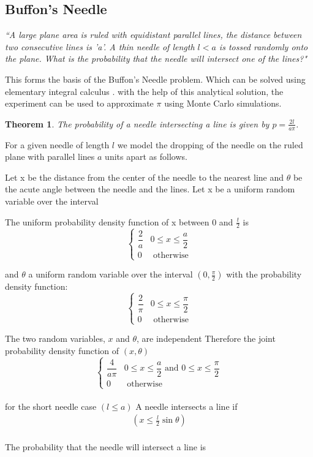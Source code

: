 \documentclass[12pt]{article}
\numberwithin{equation}{section}
\newtheorem{theorem}{Theorem}[section]
\begin{document}
\subsection{Buffon's Needle}
 \textit{“A large plane area is ruled with equidistant parallel lines, the distance between two consecutive lines is 'a'. A thin needle of length $l< a$ is tossed randomly onto the plane. What is the probability that the needle will intersect one of the lines?"}\par
 This forms the basis of the Buffon’s Needle problem. Which can be solved using elementary integral calculus \cite{needlewang}. with the help of this analytical solution, the experiment can be used to approximate $\pi$ using Monte Carlo simulations.
\begin{theorem}
The probability of a needle intersecting a line is given by $p=\frac{2l}{a \pi}$.
\end{theorem}
 For a given needle of length $l$ we model the dropping of the needle on the ruled plane with parallel lines $a$ units apart as follows. \par
 Let x be the distance from the center of the needle to the nearest line and $\theta$ be the acute angle between the needle and the lines. Let x be a uniform random variable over the interval
\par
The uniform probability density function of x between 0 and $ \frac{t}{2}$ is
\[
\begin{cases}
   \dfrac{2}{a} & 0 \leqslant x\leqslant \dfrac{a}{2}\\
  0 & \text {   otherwise}
\end{cases}
\]
\par
and $\theta$ a uniform random variable over the interval $\left(0, \frac{\pi}{2}\right)$ with the probability density function:\\
\[
\begin{cases}
    \dfrac{2}{\pi} & 0 \leqslant x\leqslant \dfrac{\pi}{2}\\
    0 & \text {   otherwise}
\end{cases}
\]
\par
The two random variables, $x$ and $\theta$, are independent  Therefore the joint probability density function of
$(x,\theta)$ 
\[
\begin{cases}
    \dfrac{4}{a\pi} &  0 \leqslant x\leqslant \dfrac{a}{2} \text{ and } 0 \leqslant x\leqslant \dfrac{\pi}{2}\\
0  &  \text {   otherwise}
\end{cases}\]
\\ for the short needle case $\left( l \leqslant a \right)$  A needle
intersects a line if
\begin{align*}
    \left( x \leqslant \frac{l}{2}\sin \theta \right )
\end{align*}
\\
The probability that the needle will intersect a line is
\end{document}
